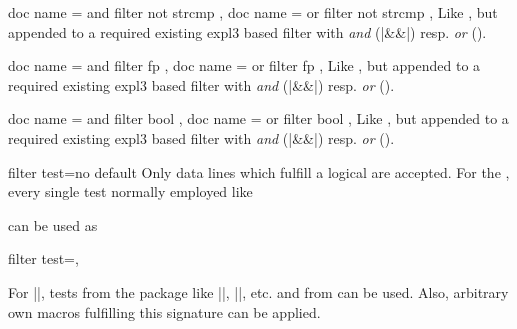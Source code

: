 \documentclass[a4paper,11pt]{ltxdoc}
\begin{document}
\begin{docCsvKeys}[
    doc parameter   = {=\marg{stringA}\marg{stringB}},
    doc description = {no default},
    doc new = {2022-10-21}
  ]
  {
    { doc name = and filter not strcmp  },
    { doc name = or filter not strcmp },
  }
  Like , but appended to a required existing
  expl3 based filter with \emph{and} (|&&|) resp. \emph{or} (\texttt{\textbar\textbar}).
\end{docCsvKeys}


\begin{docCsvKeys}[
    doc parameter   = {=\marg{floating point expression}},
    doc description = {style, no default},
    doc new = {2022-10-21}
  ]
  {
    { doc name = and filter fp  },
    { doc name = or filter fp },
  }
  Like , but appended to a required existing
  expl3 based filter with \emph{and} (|&&|) resp. \emph{or} (\texttt{\textbar\textbar}).
\end{docCsvKeys}


\begin{docCsvKeys}[
    doc parameter   = {=\marg{boolean expression}},
    doc description = {style, no default},
    doc new = {2022-10-21}
  ]
  {
    { doc name = and filter bool },
    { doc name = or filter bool },
  }
  Like , but appended to a required existing
  expl3 based filter with \emph{and} (|&&|) resp. \emph{or} (\texttt{\textbar\textbar}).
\end{docCsvKeys}


\clearpage

\begin{docCsvKey}[][doc new=2016-07-01]{filter test}{=}{no default}
  Only data lines which fulfill a logical  are accepted.
  For the , every single test normally employed like
\begin{dispListing}
\end{dispListing}
  can be used as
\begin{dispListing}
filter test=,
\end{dispListing}
  For |\iftest|, tests from the  package like
  |\ifnumcomp|, |\ifdimgreater|, etc. and from  can be used.
  Also, arbitrary own macros fulfilling this signature can be applied.
\begin{dispExample}
\end{dispExample}
\end{docCsvKey}
\end{document}
